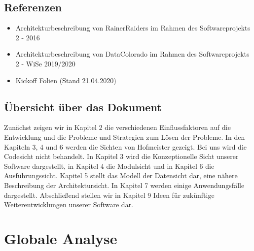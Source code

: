 \documentclass[fontsize=12pt,paper=a4,twoside]{scrartcl}
\begin{document}
\subsection{Referenzen}

\begin{itemize}
\item{Architekturbeschreibung von RainerRaiders im Rahmen des Softwareprojekts 2 - 2016}
\item{Architekturbeschreibung von DataColorado im Rahmen des Softwareprojekts 2 - WiSe 2019/2020}
\item{Kickoff Folien (Stand 21.04.2020)}
\end{itemize}

\subsection{Übersicht über das Dokument}

Zunächst zeigen wir in Kapitel 2 die verschiedenen Einflussfaktoren auf die Entwicklung und die Probleme und Strategien zum Lösen der Probleme. In den Kapiteln 3, 4 und 6 werden die Sichten von Hofmeister gezeigt. Bei uns wird die Codesicht nicht behandelt. In Kapitel 3 wird die Konzeptionelle Sicht unserer Software dargestellt, in Kapitel 4 die Modulsicht und in Kapitel 6 die Ausführungssicht. Kapitel 5 stellt das Modell der Datensicht dar, eine nähere Beschreibung der Architektursicht. In Kapitel 7 werden einige Anwendungsfälle dargestellt. Abschließend stellen wir in Kapitel 9 Ideen für zukünftige Weiterentwicklungen unserer Software dar. 


\section{Globale Analyse} \label{sec:globale_analyse}


\end{document}
